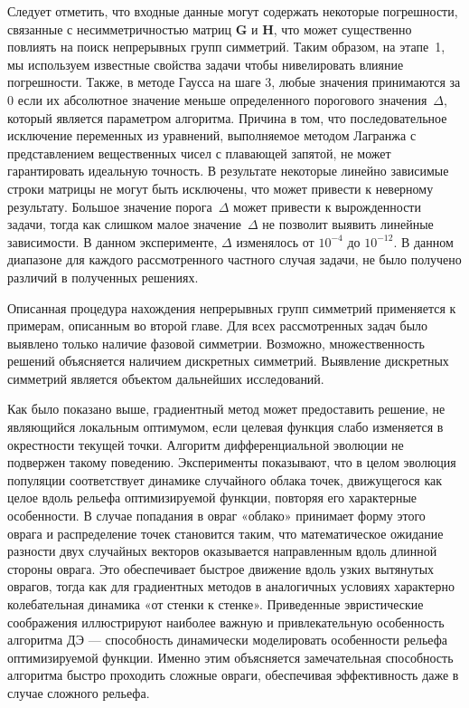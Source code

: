 Следует отметить, что входные данные могут содержать некоторые погрешности, связанные с несимметричностью матриц $\textbf{G}$ и $\textbf{H}$, что может существенно повлиять на поиск непрерывных групп симметрий. Таким образом, на этапе~1, мы используем известные свойства задачи чтобы нивелировать влияние погрешности.
Также, в методе Гаусса на шаге 3, любые значения принимаются за 0 если их абсолютное значение меньше определенного порогового значения~$\Delta$, который является параметром алгоритма. Причина в том, что последовательное исключение переменных из уравнений, выполняемое методом Лагранжа с представлением вещественных чисел с плавающей запятой, не может гарантировать идеальную точность.
В результате некоторые линейно зависимые строки матрицы не могут быть исключены, что может привести к неверному результату.
Большое значение порога~$\Delta$ может привести к вырожденности задачи, тогда как слишком малое значение~$\Delta$ не позволит выявить линейные зависимости.
В данном эксперименте, $\Delta$ изменялось от $ 10^{-4} $ до $ 10^{-12} $. В данном диапазоне для каждого рассмотренного частного случая задачи, не было получено различий в полученных решениях.


Описанная процедура нахождения непрерывных групп симметрий применяется к примерам, описанным во второй главе. Для всех рассмотренных задач было выявлено только наличие фазовой симметрии. Возможно, множественность решений объясняется наличием дискретных симметрий. Выявление дискретных симметрий является объектом дальнейших исследований.

Как было показано выше, градиентный метод может предоставить решение, не являющийся локальным оптимумом, если целевая функция слабо изменяется в окрестности текущей точки. Алгоритм дифференциальной эволюции не подвержен такому поведению.
Эксперименты показывают, что в целом эволюция популяции соответствует динамике случайного облака точек, движущегося как целое вдоль рельефа оптимизируемой функции, повторяя его характерные особенности. В случае попадания в овраг «облако» принимает форму этого оврага и распределение точек становится таким, что математическое ожидание разности двух случайных векторов оказывается направленным вдоль длинной стороны оврага. Это обеспечивает быстрое движение вдоль узких вытянутых оврагов, тогда как для градиентных методов в аналогичных условиях характерно колебательная динамика «от стенки к стенке». Приведенные эвристические соображения иллюстрируют наиболее важную и привлекательную особенность алгоритма ДЭ — способность динамически моделировать особенности рельефа оптимизируемой функции. Именно этим объясняется замечательная способность алгоритма быстро проходить сложные овраги, обеспечивая эффективность даже в случае сложного рельефа.

